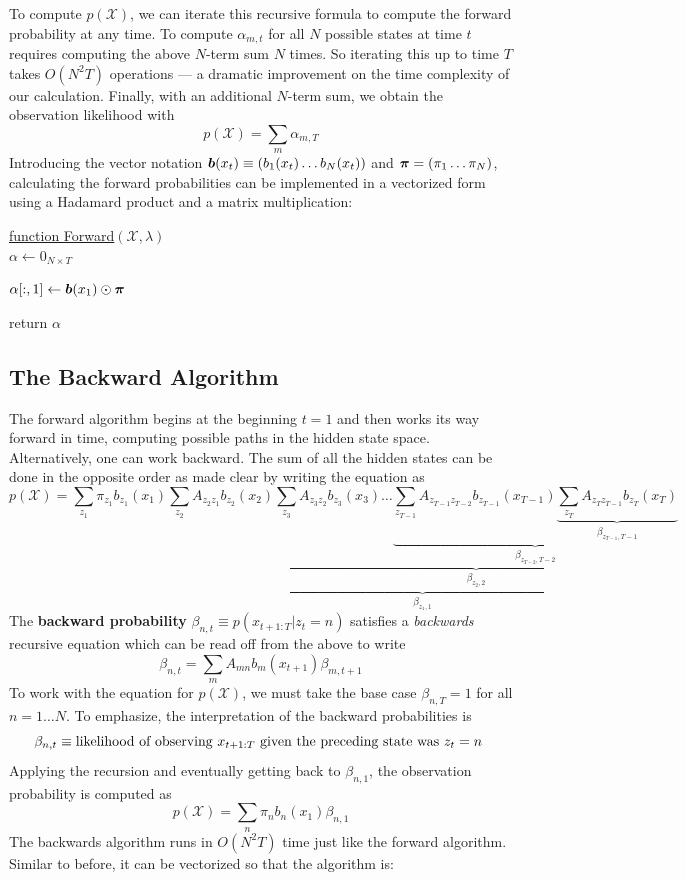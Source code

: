 \documentclass[onecolumn]{gwclass}
\begin{document}
	To compute $p(\mathcal{X})$, we can iterate this recursive formula to compute the forward probability at any time. To compute $\alpha_{m,t}$ for all $N$ possible states at time $t$ requires computing the above $N$-term sum $N$ times. So iterating this up to time $T$ takes $O(N^2T)$ operations --- a dramatic improvement on the time complexity of our calculation. Finally, with an additional $N$-term sum, we obtain the observation likelihood with 
	$$ p(\mathcal{X}) = \sum_m\alpha_{m,T} $$
	Introducing the vector notation $\boldsymbol{b}(x_t)\equiv(b_1(x_t)\dots b_N(x_t))$ and $\boldsymbol{\pi}=(\pi_1\dots\pi_N)$, calculating the forward probabilities can be implemented in a vectorized form using a Hadamard product and a matrix multiplication:
	
	\begin{algorithm}
		\caption{Forward Algorithm --- Vectors}
		
		\underline{function Forward}$(\mathcal{X},\lambda)$\\
		$\alpha \leftarrow 0_{N\times T}$
		
		$\alpha[:,1] \leftarrow \boldsymbol{b}(x_1)\odot \boldsymbol{\pi}$
		
		
		return $\alpha$
	\end{algorithm}
	
	\subsection{The Backward Algorithm}
	The forward algorithm begins at the beginning $t=1$ and then works its way forward in time, computing possible paths in the hidden state space. Alternatively, one can work backward. The sum of all the hidden states can be done in the opposite order as made clear by writing the equation as
	$$p(\mathcal{X}) = \sum_{z_1}\pi_{z_1}b_{z_1}(x_1)
	\underbrace{\sum_{z_2}A_{z_2z_1}b_{z_2}(x_2)
		\underbrace{\sum_{z_3}A_{z_3z_2}b_{z_3}(x_3)\dots \underbrace{\sum_{z_{T-1}}A_{z_{T-1}z_{T-2}}b_{z_{T-1}}(x_{T-1})
				\underbrace{\sum_{z_T}A_{z_Tz_{T-1}}{b_{z_T}(x_T)}}_{\beta_{z_{T-1},T-1}}}_{\beta_{z_{T-2},T-2}}}_{\beta_{z_2,2}}}_{\beta_{z_1,1}}$$
	The \textbf{backward probability} $\beta_{n,t}\equiv p(x_{t+1:T}|z_t=n)$ satisfies a \emph{backwards} recursive equation which can be read off from the above to write
	$$ \beta_{n,t} = \sum_m A_{mn} b_m(x_{t+1})\beta_{m,t+1} $$
	To work with the equation for $p(\mathcal{X})$, we must take the base case $\beta_{n,T}=1$ for all $n=1\dots N$. To emphasize, the interpretation of the backward probabilities is
	$$ \beta_{n,t} \equiv \text{\normalfont{likelihood of observing $x_{t+1:T}$ given the preceding state was $z_t=n$ }} $$
	Applying the recursion and eventually getting back to $\beta_{n,1}$, the observation probability is computed as
	$$ p(\mathcal{X}) = \sum_n\pi_nb_n(x_1)\beta_{n,1} $$
	The backwards algorithm runs in $O(N^2T)$ time just like the forward algorithm. Similar to before, it can be vectorized so that the algorithm is:
	
\end{document}

